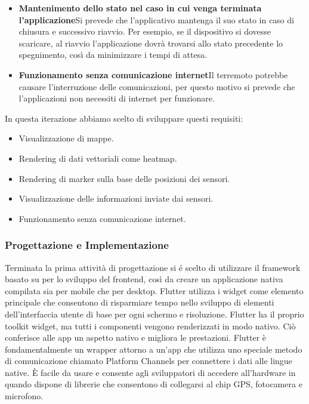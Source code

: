 \documentclass[a4paper]{report}
\begin{document}
\begin{itemize}
    \item \textbf{Mantenimento dello stato nel caso in cui venga terminata l'applicazione}\newline Si prevede che l'applicativo mantenga il suo stato in caso di chiusura e successivo riavvio. Per esempio, se il dispositivo si dovesse scaricare, al riavvio l'applicazione dovrà trovarsi allo stato precedente lo spegnimento, così da minimizzare i tempi di attesa.
    \item \textbf{Funzionamento senza comunicazione internet}\newline Il terremoto potrebbe causare l'interruzione delle comunicazioni, per questo motivo si prevede che l'applicazioni non necessiti di internet per funzionare.
    \end{itemize} 
In questa iterazione abbiamo scelto di sviluppare questi requisiti:
\begin{itemize}
    \item Visualizzazione di mappe.
    \item Rendering di dati vettoriali come heatmap.
    \item Rendering di marker sulla base delle posizioni dei sensori.
    \item Visualizzazione delle informazioni inviate dai sensori.
    \item Funzionamento senza comunicazione internet.
    \end{itemize} 

\subsubsection*{{Progettazione e Implementazione}}
Terminata la prima attività di progettazione si é scelto di utilizzare il framework \cite{Flutter} basato su \cite{Dart} per lo sviluppo del frontend, così da creare un applicazione nativa compilata sia per mobile che per desktop. Flutter utilizza i widget come elemento principale che consentono di risparmiare tempo nello sviluppo di elementi dell'interfaccia utente di base per ogni schermo e risoluzione. Flutter ha il proprio toolkit widget, ma tutti i componenti vengono renderizzati in modo nativo. Ciò conferisce alle app un aspetto nativo e migliora le prestazioni. Flutter è fondamentalmente un wrapper attorno a un'app che utilizza uno speciale metodo di comunicazione chiamato Platform Channels per connettere i dati alle lingue native. È facile da usare e consente agli sviluppatori di accedere all'hardware in quando dispone di librerie che consentono di collegarsi al chip GPS, fotocamera e microfono\cite*{FlutterMedium}.
\end{document}
